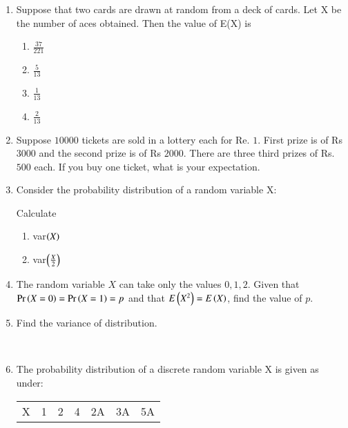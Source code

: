 \begin{enumerate}[label=\thechapter.\arabic*,ref=\thechapter.\theenumi]
\begin{enumerate}
\end{enumerate}

\item Suppose that two cards are drawn at random from a deck of cards. Let X be the
number of aces obtained. Then the value of E(X) is
\begin{enumerate}

\item $\frac{37}{221}$
\item $\frac{5}{13}$
\item $\frac{1}{13}$
\item $\frac{2}{13}$

\end{enumerate}

\item Suppose $10000$ tickets are sold in a lottery each for Re. $1$. First prize is of Rs $3000$ and the second prize is of Rs $2000$. There are three third prizes of Rs. $500$ each. If you buy one ticket, what is your expectation.

\item Consider the probability distribution of a random variable X:
\begin{table}[H]
        \centering
        
        \label{tab:exemplar/12/13/3/24}
    \end{table}
Calculate
\begin{enumerate}[label=(\roman*)]
\item var$\left(X\right)$
\item var$\left(\frac{X}{2}\right)$
\end{enumerate}
\solution

\item The random variable $X$ can take only the values $0,1,2$. Given that $\Pr\left(X=0\right)=\Pr\left(X=1\right)=p$ and that $E\left(X^2\right) = E\left(X\right)$, find the value of $p$.
\\

\item Find the variance of distribution.
\begin{table}[!ht]
	
\end{table}\\

\item The probability distribution of a discrete random variable X is given as under:
\begin{table}[ht]
    \centering
\begin{tabular}{|c|c|c|c|c|c|c|}
\hline
X & 1 & 2 & 4 & 2A & 3A & 5A  \\

\end{tabular}
\end{table}
\end{enumerate}
